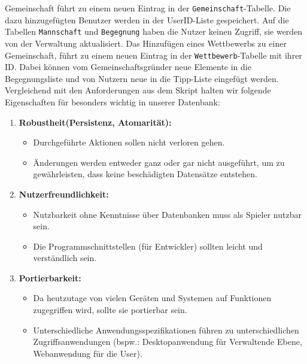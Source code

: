 \documentclass[a4paper,11pt,fleqn]{scrartcl}
\begin{document}
\begin{enumerate}
\begin{enumerate}
             Gemeinschaft führt zu einem neuen Eintrag in der \texttt{Gemeinschaft}-Tabelle. Die dazu hinzugefügten Benutzer werden in der 
              UserID-Liste gespeichert. Auf die Tabellen \texttt{Mannschaft} und \texttt{Begegnung} haben die Nutzer keinen Zugriff, sie werden von der
               Verwaltung aktualisiert. Das Hinzufügen eines Wettbewerbs zu einer Gemeinschaft, führt zu einem neuen Eintrag
                in der \texttt{Wettbewerb}-Tabelle mit ihrer ID. Dabei können vom  Gemeinschaftsgründer neue Elemente in die Begegnungsliste und
                 von Nutzern neue in die Tipp-Liste eingefügt werden.
                  \newline
            Vergleichend mit den Anforderungen aus dem Skript halten wir folgende Eigenschaften für besonders wichtig in 
            unserer Datenbank:
            \begin{enumerate}
                \item \textbf{Robustheit(Persistenz, Atomarität):}
                \begin{itemize}
                    \item Durchgeführte Aktionen sollen nicht verloren gehen.
                    \item Änderungen werden entweder ganz oder gar nicht ausgeführt, um zu gewährleisten, dass keine 
                    beschädigten Datensätze entstehen.
                \end{itemize}
                \item \textbf{Nutzerfreundlichkeit:}
                \begin{itemize}
                    \item Nutzbarkeit ohne Kenntnisse über Datenbanken muss als Spieler nutzbar sein.
                    \item Die Programmschnittstellen (für Entwickler) sollten leicht und verständlich sein.
                \end{itemize}
                \item \textbf{Portierbarkeit:}
                \begin{itemize}
                    \item Da heutzutage von vielen Geräten und Systemen auf Funktionen zugegriffen wird, sollte sie portierbar 
                    sein.
                    \item Unterschiedliche Anwendungsspezifikationen führen zu unterschiedlichen Zugriffsanwendungen (bspw.: 
                    Desktopanwendung für Verwaltende Ebene, Webanwendung für die User).

\end{itemize}
\end{enumerate}
\end{enumerate}
\end{enumerate}
\end{document}
